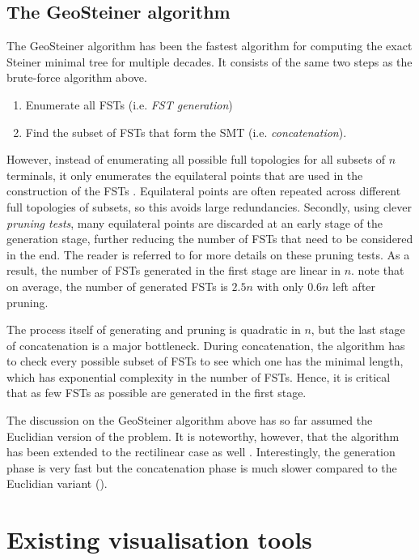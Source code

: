 \documentclass{l4proj}
\begin{document}
\subsection{The GeoSteiner algorithm}
The GeoSteiner algorithm has been the fastest algorithm for computing the exact Steiner minimal tree for multiple decades.
It consists of the same two steps as the brute-force algorithm above.
\begin{enumerate}
    \item Enumerate all FSTs (i.e. \textit{FST generation})
    \item Find the subset of FSTs that form the SMT (i.e. \textit{concatenation}).
\end{enumerate}
However, instead of enumerating all possible full topologies for all subsets of $n$ terminals, it only enumerates the equilateral points that are used in the construction of the FSTs \citep{geosteiner96}. Equilateral points are often repeated across different full topologies of subsets, so this avoids large redundancies. Secondly, using clever \textit{pruning tests}, many equilateral points are discarded at an early stage of the generation stage, further reducing the number of FSTs that need to be considered in the end. The reader is referred to \cite{geosteiner96} for more details on these pruning tests.
As a result, the number of FSTs generated in the first stage are linear in $n$. \cite{29ee725d11ac4584b72f7fe66c4326fa} note that on average, the number of generated FSTs is $2.5n$ with only $0.6n$ left after pruning.

The process itself of generating and pruning is quadratic in $n$, but the last stage of concatenation is a major bottleneck. During concatenation, the algorithm has to check every possible subset of FSTs to see which one has the minimal length, which has exponential complexity in the number of FSTs. Hence, it is critical that as few FSTs as possible are generated in the first stage.

The discussion on the GeoSteiner algorithm above has so far assumed the Euclidian version of the problem. It is noteworthy, however, that the algorithm has been extended to the rectilinear case as well \citep{rectilinear_geosteiner}. Interestingly, the generation phase is very fast but the concatenation phase is much slower compared to the Euclidian variant (\citep{29ee725d11ac4584b72f7fe66c4326fa}).


\section{Existing visualisation tools}
\end{document}
